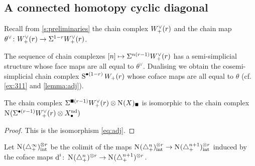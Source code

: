 \subsection{A connected homotopy cyclic diagonal}

Recall from \cref{s:preliminaries} the chain complex $W^\vee_+(r)$ and the chain map $\theta^\vee\colon W^\vee_+(r)\to \Sigma^{1-r}W^\vee_+(r)$.

\begin{definition} The sequence of chain complexes $[n]\mapsto \Sigma^{n(r-1)}W^\vee_+(r)$ has a semi-simplicial structure whose face maps are all equal to $\theta^\vee$. Dualising we obtain the cosemi-simplicial chain complex $\operatorname{S}^{\bullet(1-r)}W_+(r)$ whose coface maps are all equal to $\theta$ (cf. \cref{ex:311} and \cref{lemma:adj}).
\end{definition}

\begin{lemma}\label{lemma:hotimessimp}
	The chain complex $\susp{\bs(r-1)}\Wdualaug{r}\ot \chains(X)_\bs$ is isomorphic to the chain complex $\operatorname{N}_{}(\Sigma^{\bullet(r-1)}W^\vee_+(r) \otimes X^{\mathrm{nd}}_\bullet)$
\end{lemma}
\begin{proof}
	This is the isomorphism \eqref{eq:adj}.
\end{proof}
Let $\operatorname{N}_{}(\triangle_{+}^\infty)^{\otimes r}_{\mathrm{int}}$ be the colimit of the maps $\operatorname{N}_{}(\triangle_{+}^n)^{\otimes r}_{\mathrm{int}} \to \operatorname{N}_{}(\triangle_{+}^{n+1})^{\otimes r}_{\mathrm{int}}$ induced by the coface maps
$\operatorname{d}^i\colon \operatorname{N}_{}(\triangle_{+}^n)^{\otimes r} \to \operatorname{N}_{}(\triangle_{+}^{n+1})^{\otimes r}$.


